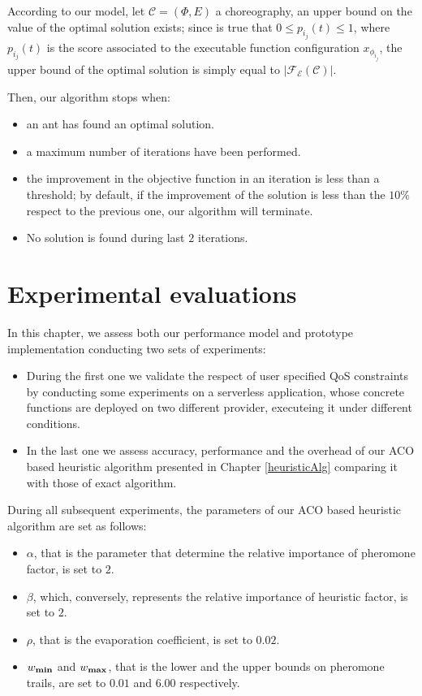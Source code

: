 \documentclass[12pt,a4paper]{report}
\begin{document}
According to our model, let $\mathcal{C} = (\Phi,E)$ a choreography, an upper bound on the value of the optimal solution exists; since is true that $0 \leq p_{i_j}(t) \leq 1$, where $p_{i_j}(t)$ is the score associated to the executable function configuration $x_{\phi_{i_j}}$, the upper bound of the optimal solution is simply equal to $|\mathscr{F_E}(\mathcal{C})|$.

Then, our algorithm stops when:

\begin{itemize}
	\item an ant has found an optimal solution.
	\item a maximum number of iterations have been performed.
	\item the improvement in the objective function in an iteration is less than a threshold; by default, if the improvement of the solution is less than the $10\%$ respect to the previous one, our algorithm will terminate.
	\item No solution is found during last $2$ iterations.
\end{itemize}


\newpage

\chapter{Experimental evaluations}\label{chapterExperimental}

In this chapter, we assess both our performance model and prototype implementation conducting two sets of experiments:

\begin{itemize}
	\item During the first one we validate the respect of user specified QoS constraints by conducting some experiments on a serverless application, whose concrete functions are deployed on two different provider, executeing it under different conditions.

	\item In the last one we assess accuracy, performance and the overhead of our ACO based heuristic algorithm presented in Chapter \ref{heuristicAlg} comparing it with those of exact algorithm.
\end{itemize}

During all subsequent experiments, the parameters of our ACO based heuristic algorithm are set as follows:

\begin{itemize}
	\item $\alpha$, that is the parameter that determine the relative importance of pheromone factor, is set to $2$.
	\item $\beta$, which, conversely, represents the relative importance of heuristic factor, is set to $2$.
	\item $\rho$, that is the evaporation coefficient, is set to $0.02$.
	\item $w_{\text{\textbf{min}}}$ and $w_{\text{\textbf{max}}}$, that is the lower and the upper bounds on pheromone trails, are set to $0.01$ and $6.00$ respectively.
\end{itemize}
\end{document}
